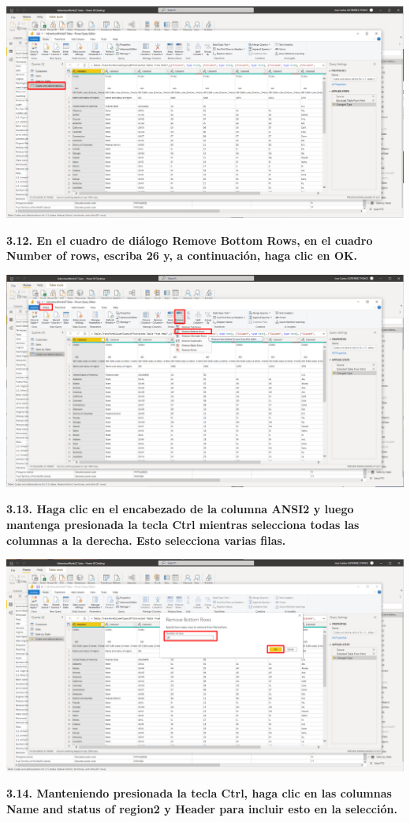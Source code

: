 \documentclass{article}
\begin{document}
    \begin{center}
		\includegraphics[width=14cm]{./images/58} 
	\end{center}
\newpage
\textbf{3.12. En el cuadro de diálogo \textbf{Remove Bottom Rows}, en el cuadro \textbf{Number of rows}, escriba \textbf{26} y, a continuación, haga clic en \textbf{OK}.}

    \begin{center}
		\includegraphics[width=14cm]{./images/59} 
	\end{center}

\textbf{3.13. Haga clic en el encabezado de la columna \textbf{ANSI2} y luego mantenga presionada la tecla Ctrl mientras selecciona todas las columnas a la derecha. Esto selecciona varias filas.}

    \begin{center}
		\includegraphics[width=14cm]{./images/60} 
	\end{center}
\newpage
\textbf{3.14. Manteniendo presionada la tecla Ctrl, haga clic en las columnas \textbf{Name and status of region2} y \textbf{Header} para incluir esto en la selección.}
\end{document}
